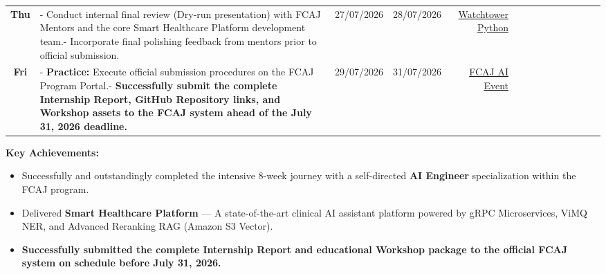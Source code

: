\begin{longtable}[]
{CloudWatch Logs} \\
\textbf{Thu} & - Conduct internal final review (Dry-run presentation)
with FCAJ Mentors and the core Smart Healthcare Platform development
team.- Incorporate final polishing feedback from mentors prior to
official submission. & 27/07/2026 & 28/07/2026 &
\href{https://github.com/kislyuk/watchtower}{Watchtower Python} \\
\textbf{Fri} & - \textbf{Practice:} Execute official submission
procedures on the FCAJ Program Portal.- \textbf{Successfully submit the
complete Internship Report, GitHub Repository links, and Workshop assets
to the FCAJ system ahead of the July 31, 2026 deadline.} & 29/07/2026 &
31/07/2026 & \href{https://fcaj-event.aws.dev/}{FCAJ AI Event} \\
\end{longtable}
\endgroup

\vspace{0.5em}\noindent\textbf{Key Achievements:}

\begin{itemize}
\tightlist
\item
  Successfully and outstandingly completed the intensive 8-week journey
  with a self-directed \textbf{AI Engineer} specialization within the
  FCAJ program.
\item
  Delivered \textbf{Smart Healthcare Platform} --- A state-of-the-art
  clinical AI assistant platform powered by gRPC Microservices, ViMQ
  NER, and Advanced Reranking RAG (Amazon S3 Vector).
\item
  \textbf{Successfully submitted the complete Internship Report and
  educational Workshop package to the official FCAJ system on schedule
  before July 31, 2026.}
\end{itemize}
